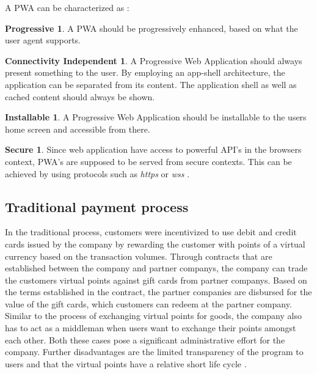 A PWA can be characterized as \cite{pwas}:

\theoremstyle{definition}
\newtheorem*{theorem-progressive}{Progressive}
\newtheorem*{theorem}{Connectivity Independent}
\newtheorem*{theorem-install}{Installable}
\newtheorem*{theorem-secure}{Secure}

\begin{theorem-progressive}
A PWA should be progressively enhanced, based on what the user agent supports.
\end{theorem-progressive}

\begin{theorem}
A Progressive Web Application should always present something to the user. By employing an app-shell architecture, the application can be separated from its content. The application shell as well as cached content should always be shown.
\end{theorem}
\begin{theorem-install}
A Progressive Web Application should be installable to the users home screen and accessible from there.

\end{theorem-install}
\begin{theorem-secure}
Since web application have access to powerful API's in the browsers context, PWA's are supposed to be served from secure contexts. This can be achieved by using protocols such as \textit{https} or \textit{wss} \cite{securitychrome}.

\end{theorem-secure}
\subsection{Traditional payment process}
In the traditional process, customers were incentivized to use debit and credit cards issued by the company by rewarding the customer with points of a virtual currency based on the transaction volumes.
Through contracts that are established between the company and partner companys, the company can trade the customers virtual points against gift cards from partner companys.
Based on the terms established in the contract, the partner companies are disbursed for the value of the gift cards, which customers can redeem at the partner company.
Similar to the process of exchanging virtual points for goods, the company also has to act as a middleman when users want to exchange their points amongst each other. Both these cases pose a significant administrative effort for the company. Further disadvantages are the limited transparency of the program to users and that the virtual points have a relative short life cycle \cite{lisg}.

